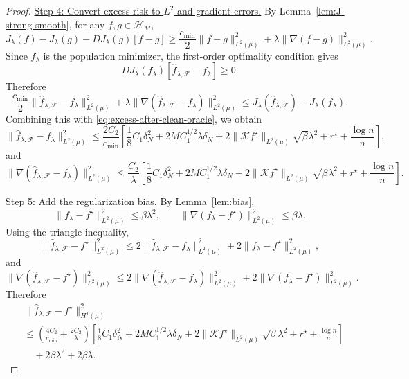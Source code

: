 \documentclass[11pt]{article}
\theoremstyle{plain}
\theoremstyle{definition}
\theoremstyle{remark}
\newcommand{\proofstep}[1]{\par\medskip\noindent\uline{#1}}
\begin{document}
\begin{proof}
\proofstep{Step 4: Convert excess risk to \(L^2\) and gradient errors.}
By Lemma~\ref{lem:J-strong-smooth}, for any \(f,g\in\mathcal H_M\),
\[
J_\lambda(f)-J_\lambda(g)-DJ_\lambda(g)[f-g]
\ge
\frac{c_{\min}}{2}
\|f-g\|_{L^2(\mu)}^2
+
\lambda
\|\nabla(f-g)\|_{L^2(\mu)}^2.
\]
Since \(f_\lambda\) is the population minimizer, the first-order optimality
condition gives
\[
DJ_\lambda(f_\lambda)
[
\widehat f_{\lambda,\mathcal F}-f_\lambda
]
\ge 0.
\]
Therefore
\[
\frac{c_{\min}}{2}
\|\widehat f_{\lambda,\mathcal F}-f_\lambda\|_{L^2(\mu)}^2
+
\lambda
\|\nabla(\widehat f_{\lambda,\mathcal F}-f_\lambda)\|_{L^2(\mu)}^2
\le
J_\lambda(\widehat f_{\lambda,\mathcal F})
-
J_\lambda(f_\lambda).
\]
Combining this with \eqref{eq:excess-after-clean-oracle}, we obtain
\begin{equation}
\label{eq:value-error-flambda-explicit}
\|\widehat f_{\lambda,\mathcal F}-f_\lambda\|_{L^2(\mu)}^2
\le
\frac{2C_2}{c_{\min}}
\left[
\frac18 C_1\delta_N^2
+
2M C_1^{1/2}\lambda\delta_N
+
2\|\mathcal K f^\star\|_{L^2(\mu)}\sqrt{\beta}\lambda^2
+
r^\star+\frac{\log n}{n}
\right],
\end{equation}
and
\begin{equation}
\label{eq:grad-error-flambda-explicit}
\|\nabla(\widehat f_{\lambda,\mathcal F}-f_\lambda)\|_{L^2(\mu)}^2
\le
\frac{C_2}{\lambda}
\left[
\frac18 C_1\delta_N^2
+
2M C_1^{1/2}\lambda\delta_N
+
2\|\mathcal K f^\star\|_{L^2(\mu)}\sqrt{\beta}\lambda^2
+
r^\star+\frac{\log n}{n}
\right].
\end{equation}

\proofstep{Step 5: Add the regularization bias.}
By Lemma~\ref{lem:bias},
\[
\|f_\lambda-f^\star\|_{L^2(\mu)}^2
\le
\beta\lambda^2,
\qquad
\|\nabla(f_\lambda-f^\star)\|_{L^2(\mu)}^2
\le
\beta\lambda.
\]
Using the triangle inequality,
\[
\|\widehat f_{\lambda,\mathcal F}-f^\star\|_{L^2(\mu)}^2
\le
2
\|\widehat f_{\lambda,\mathcal F}-f_\lambda\|_{L^2(\mu)}^2
+
2
\|f_\lambda-f^\star\|_{L^2(\mu)}^2,
\]
and
\[
\|\nabla(\widehat f_{\lambda,\mathcal F}-f^\star)\|_{L^2(\mu)}^2
\le
2
\|\nabla(\widehat f_{\lambda,\mathcal F}-f_\lambda)\|_{L^2(\mu)}^2
+
2
\|\nabla(f_\lambda-f^\star)\|_{L^2(\mu)}^2.
\]
Therefore
\begin{equation}
\label{eq:H1-final-before-choice-explicit}
\begin{aligned}
&\|\widehat f_{\lambda,\mathcal F}-f^\star\|_{H^1(\mu)}^2\\
&\le
\left(
\frac{4C_2}{c_{\min}}
+
\frac{2C_2}{\lambda}
\right)
\left[
\frac18 C_1\delta_N^2
+
2M C_1^{1/2}\lambda\delta_N
+
2\|\mathcal K f^\star\|_{L^2(\mu)}\sqrt{\beta}\lambda^2
+
r^\star+\frac{\log n}{n}
\right] \\
&\quad
+
2\beta\lambda^2
+
2\beta\lambda.
\end{aligned}
\end{equation}


\end{proof}
\end{document}
